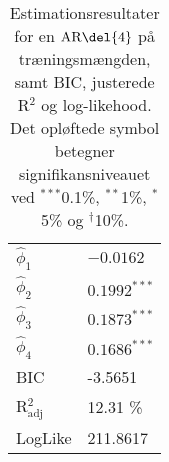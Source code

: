 \begin{table}[h]
\center
\begin{tabular}{ll}
\toprule
$\widehat{\phi}_1$ &$ -0.0162 $ \\
$\widehat{\phi}_2$ & $0.1992^{***}$  \\
$\widehat{\phi}_3$ &$0.1873^{***}$  \\
$\widehat{\phi}_4$ &$0.1686^{***} $ \\ \midrule
BIC & -3.5651 \\
 R$^2_{\text{adj}}$ & 12.31 \% \\
LogLike &  211.8617\\ \bottomrule
 \end{tabular}
\caption{Estimationsresultater for en \(\text{AR} \del{4}\) på træningsmængden, samt BIC, justerede R$^2$ og log-likehood. Det opløftede symbol betegner signifikansniveauet ved $^{***}$0.1\%, $^{**}$1\%, $^{*}$5\% og $^{\dagger}$10\%.} \label{tab:est_ar}
\end{table}